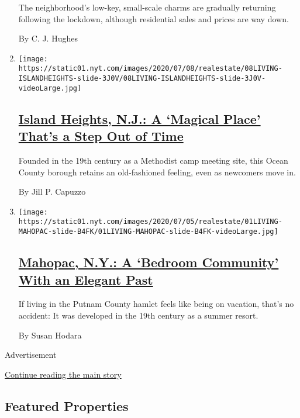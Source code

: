 \begin{enumerate}
  The neighborhood's low-key, small-scale charms are gradually returning
  following the lockdown, although residential sales and prices are way
  down.

  By C. J. Hughes
\item
  \texttt{[image: https://static01.nyt.com/images/2020/07/08/realestate/08LIVING-ISLANDHEIGHTS-slide-3J0V/08LIVING-ISLANDHEIGHTS-slide-3J0V-videoLarge.jpg]}

  \hypertarget{island-heights-nj-a-magical-place-thats-a-step-out-of-time}{%
  \subsection{\texorpdfstring{\href{/2020/07/08/realestate/island-heights-nj-a-magical-place-thats-a-step-out-of-time.html}{Island
  Heights, N.J.: A `Magical Place' That's a Step Out of
  Time}}{Island Heights, N.J.: A `Magical Place' That's a Step Out of Time}}\label{island-heights-nj-a-magical-place-thats-a-step-out-of-time}}

  Founded in the 19th century as a Methodist camp meeting site, this
  Ocean County borough retains an old-fashioned feeling, even as
  newcomers move in.

  By Jill P. Capuzzo
\item
  \texttt{[image: https://static01.nyt.com/images/2020/07/05/realestate/01LIVING-MAHOPAC-slide-B4FK/01LIVING-MAHOPAC-slide-B4FK-videoLarge.jpg]}

  \hypertarget{mahopac-ny-a-bedroom-community-with-an-elegant-past}{%
  \subsection{\texorpdfstring{\href{/2020/07/01/realestate/mahopac-ny-a-bedroom-community-with-an-elegant-past.html}{Mahopac,
  N.Y.: A `Bedroom Community' With an Elegant
  Past}}{Mahopac, N.Y.: A `Bedroom Community' With an Elegant Past}}\label{mahopac-ny-a-bedroom-community-with-an-elegant-past}}

  If living in the Putnam County hamlet feels like being on vacation,
  that's no accident: It was developed in the 19th century as a summer
  resort.

  By Susan Hodara
\end{enumerate}

Advertisement

\protect\hyperlink{after-mid2}{Continue reading the main story}

\hypertarget{featured-properties}{%
\subsection{Featured Properties}\label{featured-properties}}

